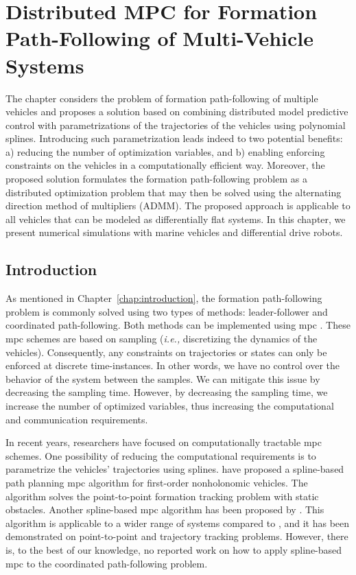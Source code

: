 \chapter{Distributed MPC for Formation Path-Following of Multi-Vehicle Systems}
\label{chap:handpos_MPC}


The chapter considers the problem of formation path-following of multiple vehicles and proposes a solution based on combining distributed model predictive control with parametrizations of the trajectories of the vehicles using polynomial splines. Introducing such parametrization leads indeed to two potential benefits: a) reducing the number of optimization variables, and b) enabling enforcing constraints on the vehicles in a computationally efficient way. Moreover, the proposed solution formulates the formation path-following problem as a distributed optimization problem that may then be solved using the alternating direction method of multipliers (ADMM).
The proposed approach is applicable to all vehicles that can be modeled as differentially flat systems.
In this chapter, we present numerical simulations with marine vehicles and differential drive robots.

\section{Introduction}
    
As mentioned in Chapter~\ref{chap:introduction}, the formation path-following problem is commonly solved using two types of methods: leader-follower and coordinated path-following.
Both methods can be implemented using \acrfull{mpc} \cite{wang_path_2021,kanjanawanishkul_distributed_2008}.
These \gls{mpc} schemes are based on sampling (\emph{i.e.,} discretizing the dynamics of the vehicles).
Consequently, any constraints on trajectories or states can only be enforced at discrete time-instances.
In other words, we have no control over the behavior of the system between the samples.
We can mitigate this issue by decreasing the sampling time.
However, by decreasing the sampling time, we increase the number of optimized variables, thus increasing the computational and communication requirements.

In recent years, researchers have focused on computationally tractable \gls{mpc} schemes.
One possibility of reducing the computational requirements is to parametrize the vehicles' trajectories using splines.
\cite{saska_2016_predictive} have proposed a spline-based path planning \gls{mpc} algorithm for first-order nonholonomic vehicles.
The algorithm solves the point-to-point formation tracking problem with static obstacles.
Another spline-based \gls{mpc} algorithm has been proposed by \cite{van_parys_2017_DMPC}.
This algorithm is applicable to a wider range of systems compared to \cite{saska_2016_predictive}, and it has been demonstrated on point-to-point and trajectory tracking problems.
However, there is, to the best of our knowledge, no reported work on how to apply spline-based \gls{mpc} to the coordinated path-following problem.

